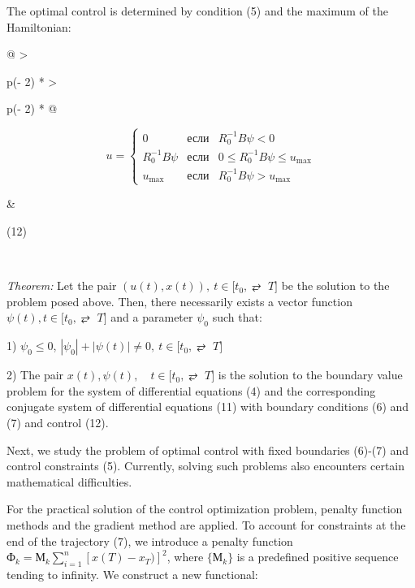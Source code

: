 The optimal control is determined by condition (5) and the maximum of
the Hamiltonian:

\begin{longtable}[]{@{}
  >{\raggedright\arraybackslash}p{(\columnwidth - 2\tabcolsep) * }
  >{\raggedright\arraybackslash}p{(\columnwidth - 2\tabcolsep) * }@{}}
\begin{minipage}[b]{\linewidth}\raggedright
\[u = \left\{ \begin{matrix}
0 & \text{если} & R_{0}^{-1}B\psi < 0 \\
R_{0}^{-1}B\psi & \text{если} & 0 \leq R_{0}^{-1}B\psi \leq u_{\max} \\
u_{\max} & \text{если} & R_{0}^{-1}B\psi > u_{\max}
\end{matrix} \right.\]
\end{minipage} & \begin{minipage}[b]{\linewidth}\raggedright
(12)
\end{minipage} \\
\end{longtable}


\emph{Theorem:} Let the pair
\(\left( u(t),x(t) \right),\ t \in \lbrack t_{0}, ⥂ \mspace{6mu} T\rbrack\)
be the solution to the problem posed above. Then, there necessarily
exists a vector function
\(\psi(t),t \in \lbrack t_{0}, ⥂ \mspace{6mu} T\rbrack\) and a parameter
$\psi_{0}$ such that:

1) \(\psi_{0} \leq 0\),
\(\left| \psi_{0} \right| + \left| \psi(t) \right| \neq 0,\ t \in \lbrack t_{0}, ⥂ \mspace{6mu} T\rbrack\)

2) The pair
\(x(t),\psi(t),\quad t \in \lbrack t_{0}, ⥂ \mspace{6mu} T\rbrack\) is
the solution to the boundary value problem for the system of
differential equations (4) and the corresponding conjugate system of
differential equations (11) with boundary conditions (6) and (7) and
control (12).

Next, we study the problem of optimal control with fixed boundaries
(6)-(7) and control constraints (5). Currently, solving such problems
also encounters certain mathematical difficulties.

For the practical solution of the control optimization problem, penalty
function methods and the gradient method are applied. To account for
constraints at the end of the trajectory (7), we introduce a penalty
function
\(Ф_{k} = М_{k}\sum_{i = 1}^{n}\left\lbrack x(T) - x_{T}) \right\rbrack^{2}\),
where \(\{ М_{k}\}\) is a predefined positive sequence tending to
infinity. We construct a new functional:

